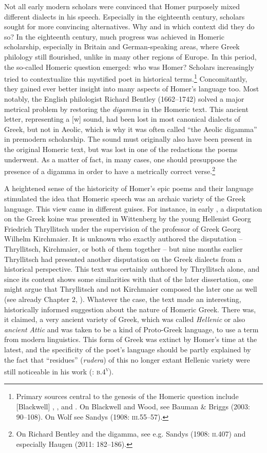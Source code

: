 Not all early modern scholars were convinced that Homer purposely mixed different dialects in his speech. Especially in the eighteenth century, scholars sought for more convincing alternatives. Why and in which context did they do so? In the eighteenth century, much progress was achieved in Homeric scholarship, especially in Britain and German-speaking areas, where Greek philology still flourished, unlike in many other regions of Europe. In this period, the so-called Homeric question emerged: who was Homer? Scholars increasingly tried to contextualize this mystified poet in historical terms.\footnote{Primary sources central to the genesis of the Homeric question include [Blackwell] , \citet{Wood1775}, and \citet{Wolf1795}. On Blackwell and Wood, see Bauman \& Briggs (2003: 90–108). On Wolf see Sandys (1908: \textsc{iii.}55–57).} Concomitantly, they gained ever better insight into many aspects of Homer’s language too. Most notably, the English philologist Richard Bentley (1662–1742) solved a major metrical problem by restoring the \textit{digamma} in the Homeric text. This ancient letter, representing a [w] sound, had been lost in most canonical dialects of Greek, but not in Aeolic, which is why it was often called “the Aeolic digamma” in premodern scholarship. The sound must originally also have been present in the original Homeric text, but was lost in one of the redactions the poems underwent. As a matter of fact, in many cases, one should presuppose the presence of a digamma in order to have a metrically correct verse.\footnote{On Richard Bentley and the digamma, see e.g. Sandys (1908: \textsc{ii.}407) and especially Haugen (2011: 182–186).}

A heightened sense of the historicity of Homer’s epic poems and their language stimulated the idea that Homeric speech was an archaic variety of the Greek language. This view came in different guises. For instance, in early \citealt{November1709}, a disputation on the Greek koine was presented in Wittenberg by the young Hellenist Georg Friedrich Thryllitsch under the supervision of the professor of Greek Georg Wilhelm Kirchmaier. It is unknown who exactly authored the disputation – Thryllitsch, Kirchmaier, or both of them together – but nine months earlier Thryllitsch had presented another disputation on the Greek dialects from a historical perspective. This text was certainly authored by Thryllitsch alone, and since its content shows some similarities with that of the later dissertation, one might argue that Thryllitsch and not Kirchmaier composed the later one as well (see already Chapter 2, ). Whatever the case, the text made an interesting, historically informed suggestion about the nature of Homeric Greek. There was, it claimed, a very ancient variety of Greek, which was called \textit{Hellenic} or also \textit{ancient} \textit{Attic} and was taken to be a kind of Proto-Greek language, to use a term from modern linguistics. This form of Greek was extinct by Homer’s time at the latest, and the specificity of the poet’s language should be partly explained by the fact that “residues” (\textit{rudera}) of this no longer extant Hellenic variety were still noticeable in his work (\citealt{KirchmaierThryllitsch1709}: \textsc{b.4}\textsc{\textsuperscript{v}}).


